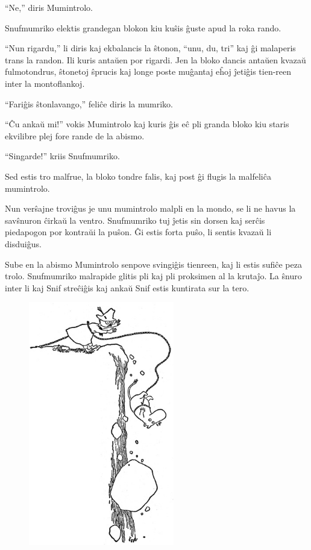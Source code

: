 ``Ne,'' diris Mumintrolo.

Snufmumriko elektis grandegan blokon kiu kuŝis ĝuste apud la roka rando.

``Nun rigardu,'' li diris kaj ekbalancis la ŝtonon, ``unu, du, tri'' kaj ĝi malaperis trans la randon. Ili kuris antaŭen por rigardi. Jen la bloko dancis antaŭen kvazaŭ fulmotondrus, ŝtonetoj ŝprucis kaj longe poste muĝantaj eĥoj ĵetiĝis tien-reen inter la montoflankoj.

``Fariĝis ŝtonlavango,'' feliĉe diris la mumriko.

``Ĉu ankaŭ mi!'' vokis Mumintrolo kaj kuris ĝis eĉ pli granda bloko kiu staris ekvilibre plej fore rande de la abismo.

``Singarde!'' kriis Snufmumriko.

Sed estis tro malfrue, la bloko tondre falis, kaj post ĝi flugis la malfeliĉa mumintrolo.

Nun verŝajne troviĝus je unu mumintrolo malpli en la mondo, se li ne havus la savŝnuron ĉirkaŭ la ventro. Snufmumriko tuj ĵetis sin dorsen kaj serĉis piedapogon por kontraŭi la puŝon. Ĝi estis forta puŝo, li sentis kvazaŭ li disduiĝus.

Sube en la abismo Mumintrolo senpove svingiĝis tienreen, kaj li estis sufiĉe peza trolo. Snufmumriko malrapide glitis pli kaj pli proksimen al la krutaĵo. La ŝnuro inter li kaj Snif streĉiĝis kaj ankaŭ Snif estis kuntirata sur la tero.

\begin{figure}
\includegraphics[width=180pt,height=302pt]{5-2.png}\end{figure}

